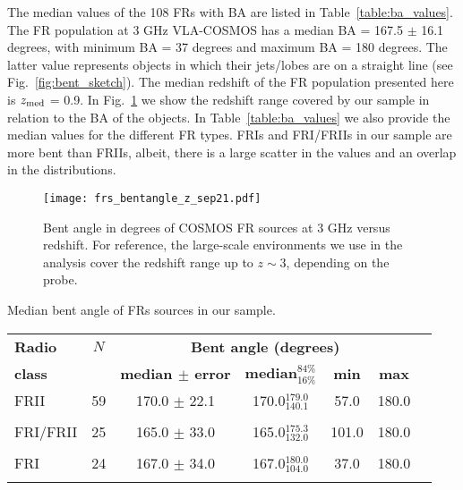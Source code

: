 \documentclass[galaxies,article,submit,moreauthors,pdftex]{Definitions/mdpi}
\begin{document}
The median values of the 108 FRs with BA are listed in Table~\ref{table:ba_values}. The FR population at 3 GHz VLA-COSMOS has a median BA = 167.5 $\pm$ 16.1 degrees, with minimum BA = 37 degrees and maximum BA = 180 degrees. The latter value represents objects in which their jets/lobes are on a straight line (see Fig.~\ref{fig:bent_sketch}). The median redshift of the FR population presented here is $z_{\rm med}$ = 0.9. In Fig.~\ref{fig:bent_z} we show the redshift range covered by our sample in relation to the BA of the objects. In Table~\ref{table:ba_values} we also provide the median values for the different FR types. FRIs and FRI/FRIIs in our sample are more bent than FRIIs, albeit, there is a large scatter in the values and an overlap in the distributions.
 

  
    \begin{figure}[!ht]
  \resizebox{\hsize}{!}
 {\texttt{[image: frs\_bentangle\_z\_sep21.pdf]}
            }
       \caption{Bent angle in degrees of COSMOS FR sources at 3 GHz versus redshift. For reference, the large-scale environments we use in the analysis cover the redshift range up to $z \sim 3$, depending on the probe.   
   }
              \label{fig:bent_z}%
    \end{figure}





\begin{specialtable}[H] 
\caption{Median bent angle of FRs sources in our sample.}
\label{table:ba_values}
\begin{tabular}{l c c c c c c}
\toprule
\textbf{Radio} & \textbf{$N$} & \multicolumn{4}{c}{\textbf{Bent angle (degrees)}} \\
\textbf{class} &  & \textbf{median $\pm$ error} & \textbf{median$^{84\%}_{16\%}$} & \textbf{min} & \textbf{max}\\
\midrule
FRII & 59 & 170.0 $\pm$ 22.1 & 170.0$^{179.0}_{140.1}$ & 57.0 & 180.0\\
\\
FRI/FRII & 25 & 165.0 $\pm$ 33.0 & 165.0$^{175.3}_{132.0}$ & 101.0 & 180.0 \\
\\
FRI & 24 & 167.0 $\pm$ 34.0 & 167.0$^{180.0}_{104.0}$ & 37.0 & 180.0 \\
\\
\bottomrule
\end{tabular}
\end{specialtable}
\end{document}

